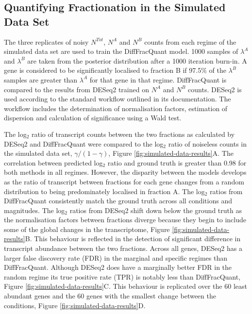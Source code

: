 \documentclass[../main.tex]{subfiles}
\begin{document}
\subsection{Quantifying Fractionation in the Simulated Data Set}

The three replicates of noisy $N^{Tot}$, $N^{A}$ and $N^{B}$ counts from each regime of the simulated data set are used to train the DiffFracQuant model.
1000 samples of $\lambda^{A}$ and $\lambda^{B}$ are taken from the posterior distribution after a 1000 iteration burn-in.
A gene is considered to be significantly localised to fraction B if 97.5\% of the $\lambda^{B}$ samples are greater than $\lambda^{A}$ for that gene in that regime.
DiffFracQuant is compared to the results from DESeq2 trained on $N^{A}$ and $N^{B}$ counts.
DESeq2 is used according to the standard workflow outlined in its documentation.
The workflow includes the determination of normalisation factors, estimation of dispersion and calculation of significance using a Wald test. 

The log$_2$ ratio of transcript counts between the two fractions as calculated by DESeq2 and DiffFracQuant were compared to the log$_2$ ratio of noiseless counts in the simulated data set, $\gamma/(1-\gamma)$, Figure \ref{fig:simulated-data-results}A.
The correlation between predicted log$_2$ ratio and ground truth is greater than 0.98 for both methods in all regimes. 
However, the disparity between the models develops as the ratio of transcript between fractions for each gene changes from a random distribution to being predominately localised in fraction A. 
The log$_2$ ratios from DiffFracQuant consistently match the ground truth across all conditions and magnitudes.
The log$_2$ ratios from DESeq2 shift down below the ground truth as the normalisation factors between fractions diverge because they begin to include some of the global changes in the transcriptome, Figure \ref{fig:simulated-data-results}B.
This behaviour is reflected in the detection of significant difference in transcript abundance between the two fractions.
Across all genes, DESeq2 has a larger false discovery rate (FDR) in the marginal and specific regimes than DiffFracQuant.
Although DESeq2 does have a marginally better FDR in the random regime its true positive rate (TPR) is notably less than DiffFracQuant, Figure \ref{fig:simulated-data-results}C.
This behaviour is replicated over the 60 least abundant genes and the 60 genes with the smallest change between the conditions, Figure \ref{fig:simulated-data-results}D.
\end{document}
